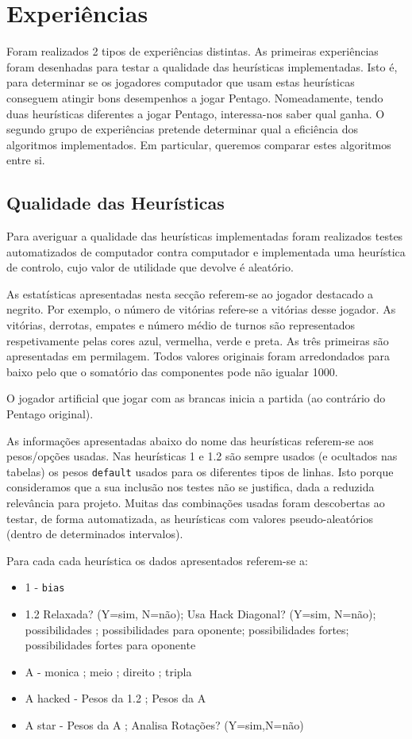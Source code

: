 
\section{Experiências}

Foram realizados 2 tipos de experiências distintas. As primeiras experiências foram desenhadas para testar a qualidade das heurísticas implementadas. Isto é, para determinar se os jogadores computador que usam estas heurísticas conseguem atingir bons desempenhos a jogar Pentago. Nomeadamente, tendo duas heurísticas diferentes a jogar Pentago, interessa-nos saber qual ganha. O segundo grupo de experiências pretende determinar qual a eficiência dos algoritmos implementados. Em particular, queremos comparar estes algoritmos entre si.

\subsection{Qualidade das Heurísticas}

Para averiguar a qualidade das heurísticas implementadas foram realizados testes automatizados de computador contra computador e implementada uma heurística de controlo, cujo valor de utilidade que devolve é aleatório. 

As estatísticas apresentadas nesta secção referem-se ao jogador destacado a negrito. Por exemplo, o número de vitórias refere-se a vitórias desse jogador. As vitórias, derrotas, empates e número médio de turnos são representados respetivamente pelas cores azul, vermelha, verde e preta. As três primeiras são apresentadas em permilagem. Todos valores originais foram arredondados para baixo pelo que o somatório das componentes pode n\~ao igualar 1000\perthousand. 

O jogador artificial que jogar com as brancas inicia a partida (ao contrário do Pentago original). 

As informações apresentadas abaixo do nome das heurísticas referem-se aos pesos/opç\~oes usadas. Nas heurísticas 1 e 1.2 são sempre usados (e ocultados nas tabelas) os pesos \verb|default| usados para os diferentes tipos de linhas. Isto porque consideramos que a sua inclusão nos testes não se justifica, dada a reduzida relevância para projeto. Muitas das combinações usadas foram descobertas ao testar, de forma automatizada, as heurísticas com valores pseudo-aleatórios (dentro de determinados intervalos).

Para cada cada heurística os dados apresentados referem-se a:
\begin{itemize}  
	\item 1 - \verb|bias|
	\item 1.2 Relaxada? (Y=sim, N=não); Usa Hack Diagonal? (Y=sim, N=não); possibilidades ; possibilidades para oponente; possibilidades fortes; possibilidades fortes para oponente
	\item A - monica ; meio ; direito ; tripla
	\item A hacked - Pesos da 1.2 ; Pesos da A
	\item A star - Pesos da A ;  Analisa Rotaç\~oes? (Y=sim,N=não)
\end{itemize} 

